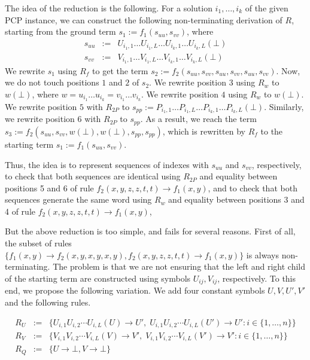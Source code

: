 \documentclass{LMCS}
\theoremstyle{plain}
\begin{document}
{The idea of the reduction is the following.
For a solution $i_1,\ldots,i_k$ of the given PCP instance,
we can construct the following non-terminating derivation of $R$,
starting from the ground term $s_1 := f_1(s_{uu}, s_{vv})$, where
\begin{eqnarray*}
 s_{uu} & := & U_{i_1,1}\ldots U_{i_1,L}\ldots U_{i_k,1}\ldots U_{i_k,L}(\bot)
\\
 s_{vv} & := & V_{i_1,1}\ldots V_{i_1,L}\ldots V_{i_k,1}\ldots V_{i_k,L}(\bot)
\end{eqnarray*}
We rewrite $s_1$ using  $R_f$ to get the
term 
$s_2 := f_2(s_{uu}, s_{vv}, s_{uu}, s_{vv}, s_{uu}, s_{vv})$.
Now, we do not touch positions $1$ and $2$ of $s_2$. 
We rewrite position $3$ using $R_w$ to $w(\bot)$, 
where $w=u_{i_1}\ldots u_{i_k}=v_{i_1}\ldots v_{i_k}$.
We rewrite position $4$ using $R_w$ to $w(\bot)$. 
We rewrite position $5$ with $R_{2P}$ 
to $s_{pp} := P_{i_1,1}\ldots P_{i_1,L}\ldots P_{i_k,1}\ldots P_{i_k,L}(\bot)$.  
Similarly, 
we rewrite position $6$ with $R_{2P}$ to $s_{pp}$.
As a result, we reach the term
$s_3 := f_2(s_{uu}, s_{vv}, w(\bot), w(\bot), s_{pp}, s_{pp})$,
which is rewritten by $R_f$ to the starting term
$s_1 := f_1(s_{uu}, s_{vv})$.

Thus, the idea is to represent sequences of indexes
with $s_{uu}$ and $s_{vv}$, respectively,
to check that both sequences are identical using
$R_{2P}$ and equality between positions 5 and 6 of
rule $f_2(x,y,z,z,t,t)\rightarrow f_1(x,y)$, and
to check that both sequences generate the same word
using $R_w$ and equality between positions 3 and 4
of rule $f_2(x,y,z,z,t,t)\rightarrow f_1(x,y)$,

But the above reduction is too simple, and fails for
several reasons. First of all, the subset of rules
$\{f_1(x,y)\rightarrow f_2(x,y,x,y,x,y),f_2(x,y,z,z,t,t)\rightarrow f_1(x,y)\}$
is always non-terminating. The problem is that we are not ensuring
that the left and right child of the starting term are constructed using
symbols $U_{ij},V_{ij}$, respectively. To this end, we propose the
following variation. We add four constant symbols $U,V,U',V'$ and the
following rules.

\begin{eqnarray*}
R_U & := & \{ U_{i,1}U_{i,2}\cdots U_{i,L}(U) \rightarrow U', \;
	      U_{i,1}U_{i,2}\cdots U_{i,L}(U') \rightarrow U' :
	      i\in\{1,\ldots,n\}\}
\\
R_V & := & \{ V_{i,1}V_{i,2}\cdots V_{i,L}(V) \rightarrow V', \; 
	      V_{i,1}V_{i,2}\cdots V_{i,L}(V') \rightarrow V' : i\in\{1,\ldots,n\}\}
\\
R_Q & := & \{U\to \bot,V\to \bot\}
\end{eqnarray*}

}
\end{document}
